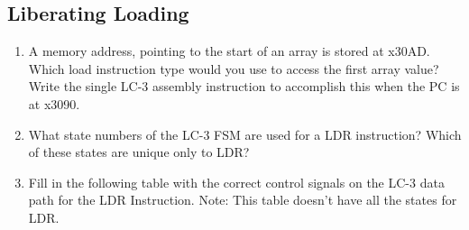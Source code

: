 \documentclass{article}
\begin{document}
\begin{enumerate}[label=(\alph*)]
    \section{Liberating Loading}
    \begin{enumerate}[label=(\alph*), itemsep = 120pt]
        \item A memory address, pointing to the start of an array is stored at x30AD. Which load instruction type would you use to access the first array value? Write the single LC-3 assembly instruction to accomplish this when the PC is at x3090.
        \item What state numbers of the LC-3 FSM are used for a LDR instruction? Which of these states are unique only to LDR?
        \item Fill in the following table with the correct control signals on the LC-3 data path for the LDR Instruction. Note: This table doesn't have all the states for LDR.
        \vspace{0cm}
       

\end{enumerate}
\end{enumerate}
\end{document}
